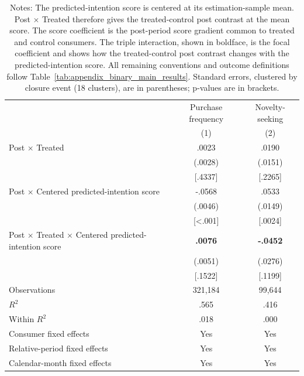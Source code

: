 \documentclass[11 pt]{article}
\newcommand\fnote[1]{\captionsetup{font=footnotesize}\caption*{#1}}
\begin{document}
\begin{table}[!ht]
\centering
\caption{Complete continuous predicted-intention specifications}
\label{tab:appendix_score_main_results}
\small
\begin{tabularx}{\textwidth}{Xcc}
\toprule
 & Purchase frequency & Novelty-seeking \\
 & (1) & (2) \\
\midrule
Post $\times$ Treated & .0023 & .0190 \\
 & (.0028) & (.0151) \\
 & [.4337] & [.2265] \\
Post $\times$ Centered predicted-intention score & -.0568 & .0533 \\
 & (.0046) & (.0149) \\
 & [<.001] & [.0024] \\
Post $\times$ Treated $\times$ Centered predicted-intention score & \textbf{.0076} & \textbf{-.0452} \\
 & (.0051) & (.0276) \\
 & [.1522] & [.1199] \\
\addlinespace
Observations & 321,184 & 99,644 \\
$R^2$ & .565 & .416 \\
Within $R^2$ & .018 & .000 \\
Consumer fixed effects & Yes & Yes \\
Relative-period fixed effects & Yes & Yes \\
Calendar-month fixed effects & Yes & Yes \\
\bottomrule
\end{tabularx}
\vspace{1mm}
\fnote{Notes: The predicted-intention score is centered at its estimation-sample mean. Post $\times$ Treated therefore gives the treated-control post contrast at the mean score. The score coefficient is the post-period score gradient common to treated and control consumers. The triple interaction, shown in boldface, is the focal coefficient and shows how the treated-control post contrast changes with the predicted-intention score. All remaining conventions and outcome definitions follow Table~\ref{tab:appendix_binary_main_results}. Standard errors, clustered by closure event (18 clusters), are in parentheses; p-values are in brackets.}
\end{table}
\end{document}

